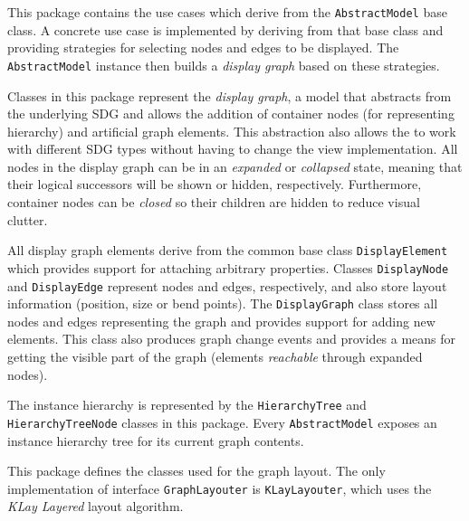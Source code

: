 \begin{description}
   This package contains the use cases which derive from the \lstinline|AbstractModel| base class. A 
  concrete use case is implemented by deriving from that base class and providing strategies for selecting nodes and 
  edges to be displayed. The \lstinline|AbstractModel| instance then builds a \emph{display graph} based on these 
  strategies.
  
   Classes in this package represent the \emph{display graph}, a model that abstracts from the 
  underlying SDG and allows the addition of container nodes (for representing hierarchy) and artificial graph elements. 
  This abstraction also allows the \SB to work with different SDG types without having to change the view 
  implementation. All nodes in the display graph can be in an \emph{expanded} or \emph{collapsed} state, meaning that 
  their logical successors will be shown or hidden, respectively. Furthermore, container nodes can be \emph{closed} so 
  their children are hidden to reduce visual clutter.
  
  All display graph elements derive from the common base class \lstinline|DisplayElement| which provides support for 
  attaching arbitrary properties. Classes \lstinline|DisplayNode| and \lstinline|DisplayEdge| represent nodes and 
  edges, respectively, and also store layout information (position, size or bend points). The \lstinline|DisplayGraph| 
  class stores all nodes and edges representing the graph and provides support for adding new elements. This class also 
  produces graph change events and provides a means for getting the visible part of the graph (elements 
  \emph{reachable} through expanded nodes).
  
   The instance hierarchy is represented by the \lstinline|HierarchyTree| and 
  \lstinline|HierarchyTreeNode| classes in this package. Every \lstinline|AbstractModel| exposes an instance hierarchy 
  tree for its current graph contents.
  
   This package defines the classes used for the graph layout. The only implementation of 
  interface \lstinline|GraphLayouter| is \lstinline|KLayLayouter|, which uses the \emph{KLay Layered}\footnotemark{} 
  layout algorithm.
  
  

\end{description}
